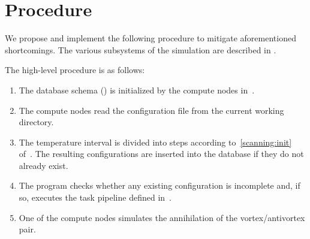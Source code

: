 \section{Procedure}
	We propose and implement the following procedure to mitigate aforementioned shortcomings. The various subsystems of the simulation are described in .
	
	The high-level procedure is as follows:
	\begin{enumerate}
		\item The database schema () is initialized by the compute nodes in~.
		\item The compute nodes read the configuration file from the current working directory.
		\item  \label{procedure_loop} The temperature interval is divided into steps according to~\cref{scanning:init} of~. The resulting configurations are inserted into the database if they do not already exist.
		\item The program checks whether any existing configuration is incomplete and, if so, executes the task pipeline defined in~.
		\item One of the compute nodes simulates the annihilation of the vortex/antivortex pair.
	\end{enumerate}



